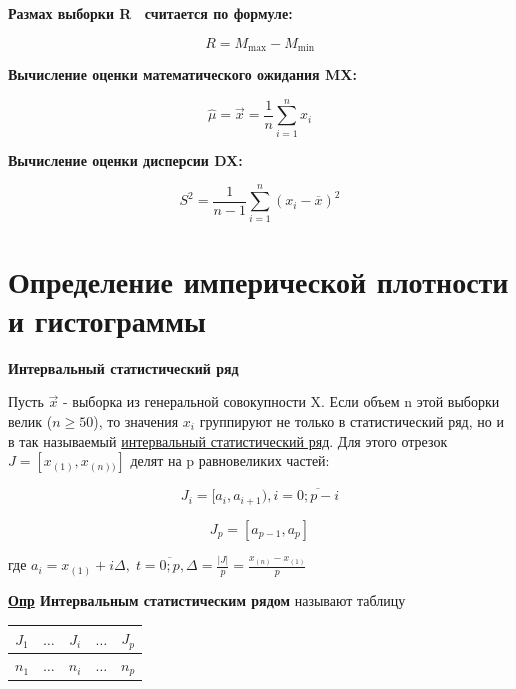 \documentclass[12pt, a4paper]{report}
\begin{document}
	\textbf{Размах выборки R  считается по формуле:}
	
	\begin{equation*} \label{R}
	R = M_{\max} - M_{\min}
	\end{equation*}
	
	\textbf{Вычисление оценки математического ожидания MX:}
	
	\begin{equation*}
	\hat{\mu} = \vec{x} = \frac{1}{n}\sum_{i=1}^{n} x_i
	\end{equation*}
	
	\textbf{Вычисление оценки дисперсии DX:}
	
	\begin{equation*}
	S^2 = \frac{1}{n-1} \sum_{i=1}^n (x_i - \overline{x})^2
	\end{equation*}
	
	\section{Определение имперической плотности и гистограммы}
	
	\hspace{0.5cm} \textbf{Интервальный статистический ряд}
	
	Пусть $\vec{x}$ - выборка из генеральной совокупности X. Если объем n этой выборки велик ($n\geq50$), то значения $x_i$ группируют не только в статистический ряд, но и в так называемый \underline{интервальный статистический ряд}. Для этого отрезок $J = [x_{(1)}, x_{(n))}]$ делят на p равновеликих частей:
	
	\begin{equation*}
	J_i = [a_i,a_{i+1}), i = \overline{0;p-i}
	\end{equation*}
	
	\begin{equation*}
	J_p = [a_{p-1},a_{p}]
	\end{equation*}
	
	\vspace{0.5cm}где $a_i = x_{(1)} + i\Delta,\; t = \overline{0;p}, \Delta = \frac{|J|}{p} = \frac{x_{(n)} - x_{(1)}}{p}$
	
	\vspace{0.5cm}\textbf{\underline{Опр} Интервальным статистическим рядом} называют таблицу
	
	\begin{table}[H]
		\centering
		\begin{tabular}{|c|c|c|c|c|}
			\hline
			$J_1$ & $\dots$ & $J_i$ & $\dots$ & $J_p$ \\
			\hline
			$n_1$ & $\dots$ & $n_i$ & $\dots$ & $n_p$ \\
			\hline
		\end{tabular}
	\end{table}
	
\end{document}
